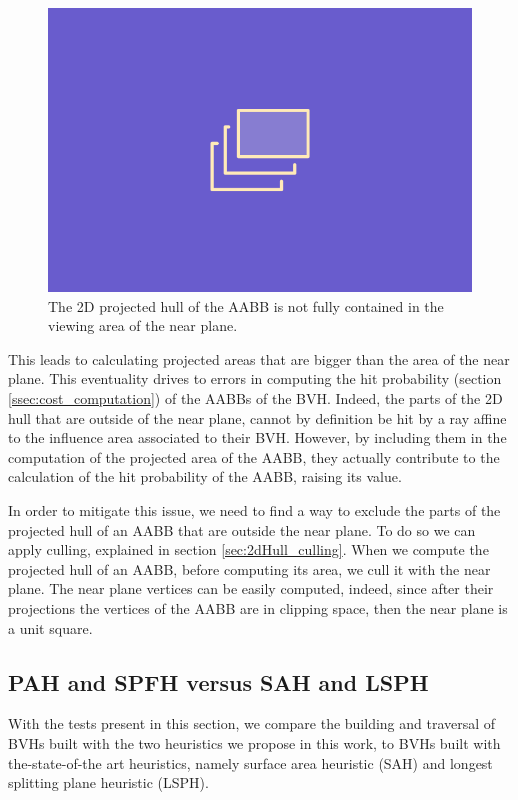 \documentclass{PoliMi_MasterThesis}
\begin{document}
\begin{figure}[H]
	\includegraphics[width=\textwidth]{Images/TODO.png}
	\caption{The 2D projected hull of the AABB is not fully contained in the viewing area of the near plane.}
	\label{fig:projection_outside_near_plane}
\end{figure}

This leads to calculating projected areas that are bigger than the area of the near plane. This eventuality drives to errors in computing the hit probability (section \ref{ssec:cost_computation}) of the AABBs of the BVH. Indeed, the parts of the 2D hull that are outside of the near plane, cannot by definition be hit by a ray affine to the influence area associated to their BVH. However, by including them in the computation of the projected area of the AABB, they actually contribute to the calculation of the hit probability of the AABB, raising its value.

In order to mitigate this issue, we need to find a way to exclude the parts of the projected hull of an AABB that are outside the near plane. To do so we can apply culling, explained in section \ref{sec:2dHull_culling}. When we compute the projected hull of an AABB, before computing its area, we cull it with the near plane. The near plane vertices can be easily computed, indeed, since after their projections the vertices of the AABB are in clipping space, then the near plane is a unit square.

\subsection{PAH and SPFH versus SAH and LSPH} \label{ssec:pah_spfh_vs_sah_lsph}
With the tests present in this section, we compare the building and traversal of BVHs built with the two heuristics we propose in this work, to BVHs built with the-state-of-the art heuristics, namely surface area heuristic (SAH) and longest splitting plane heuristic (LSPH). 
\end{document}
